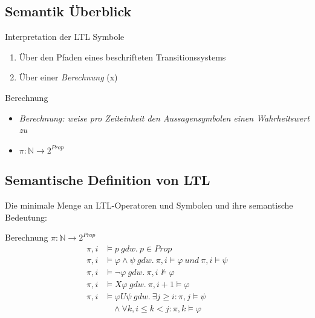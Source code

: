 \subsection{Semantik Überblick}
\begin{frame}{\insertsubsection}
    \begin{block}{Interpretation der LTL Symbole}
        \begin{enumerate}
        \setlength\itemsep{1em}
            \item Über den Pfaden eines beschrifteten Transitionssystems
            \item Über einer \textit{Berechnung} (x)
        \end{enumerate}
    \end{block}
    \pause
    \begin{block}{Berechnung}
        \begin{itemize}
        \setlength\itemsep{1em}
            \item \textit{Berechnung: weise pro Zeiteinheit den Aussagensymbolen einen Wahrheitswert zu}
            \item $\pi : \mathbb{N} \rightarrow 2^{Prop}$
        \end{itemize}
    \end{block}
\end{frame}

\subsection{Semantische Definition von LTL}
\begin{frame}{\insertsubsection}
    Die minimale Menge an LTL-Operatoren und Symbolen und ihre semantische Bedeutung:
    \begin{block}{Berechnung $\pi : \mathbb{N} \rightarrow 2^{Prop}$}
    \vspace*{-1em}
    \begin{equation*}
        \begin{split}
            \pi, i &\models p\ gdw.\ p \in Prop\\
            \pi, i &\models \varphi \land \psi\ gdw.\ \pi, i \models \varphi\ und\ \pi, i \models \psi\\
            \pi, i &\models \lnot\varphi\ gdw.\ \pi, i \not\models \varphi\\
            \pi, i &\models X\varphi\ gdw.\ \pi, i+1 \models \varphi\\
            \pi, i &\models \varphi U\psi\ gdw.\ \exists j \geq i: \pi, j \models \psi \\
            &\ \ \ \ \land \forall k, i\leq k<j: \pi, k \models \varphi
        \end{split}
    \end{equation*}
    \end{block}
\end{frame}


